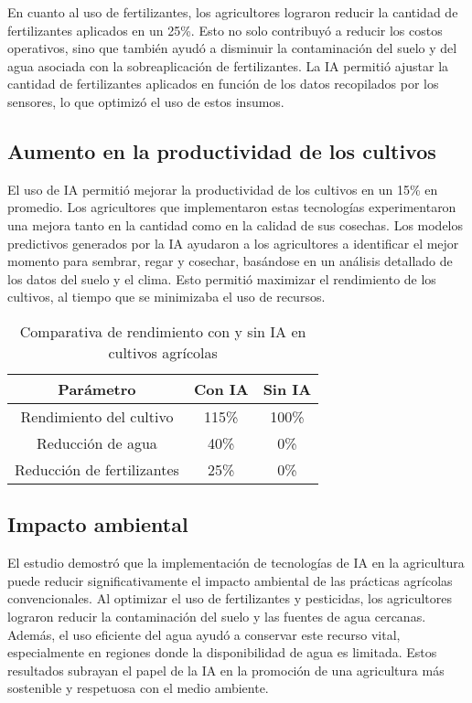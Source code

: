 \documentclass[9pt,twocolumn,twoside]{opticajnl}
\begin{document}
En cuanto al uso de fertilizantes, los agricultores lograron reducir la cantidad de fertilizantes aplicados en un 25\%. Esto no solo contribuyó a reducir los costos operativos, sino que también ayudó a disminuir la contaminación del suelo y del agua asociada con la sobreaplicación de fertilizantes. La IA permitió ajustar la cantidad de fertilizantes aplicados en función de los datos recopilados por los sensores, lo que optimizó el uso de estos insumos.

\subsection{Aumento en la productividad de los cultivos}
El uso de IA permitió mejorar la productividad de los cultivos en un 15\% en promedio. Los agricultores que implementaron estas tecnologías experimentaron una mejora tanto en la cantidad como en la calidad de sus cosechas. Los modelos predictivos generados por la IA ayudaron a los agricultores a identificar el mejor momento para sembrar, regar y cosechar, basándose en un análisis detallado de los datos del suelo y el clima. Esto permitió maximizar el rendimiento de los cultivos, al tiempo que se minimizaba el uso de recursos.

\begin{table}[htbp]
\centering
\caption{Comparativa de rendimiento con y sin IA en cultivos agrícolas}
\begin{tabular}{|c|c|c|}
\hline
\textbf{Parámetro} & \textbf{Con IA} & \textbf{Sin IA} \\
\hline
Rendimiento del cultivo & 115\% & 100\% \\
Reducción de agua & 40\% & 0\% \\
Reducción de fertilizantes & 25\% & 0\% \\
\hline
\end{tabular}
\end{table}

\subsection{Impacto ambiental}
El estudio demostró que la implementación de tecnologías de IA en la agricultura puede reducir significativamente el impacto ambiental de las prácticas agrícolas convencionales. Al optimizar el uso de fertilizantes y pesticidas, los agricultores lograron reducir la contaminación del suelo y las fuentes de agua cercanas. Además, el uso eficiente del agua ayudó a conservar este recurso vital, especialmente en regiones donde la disponibilidad de agua es limitada. Estos resultados subrayan el papel de la IA en la promoción de una agricultura más sostenible y respetuosa con el medio ambiente.
\end{document}
